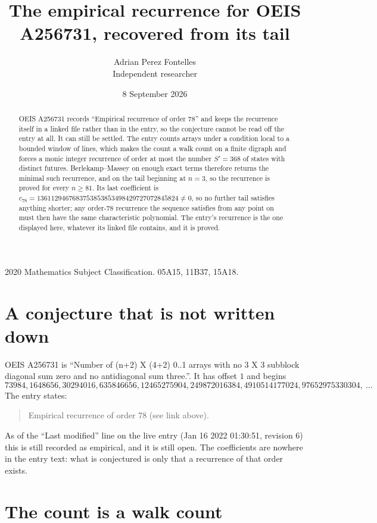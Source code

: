 \documentclass[11pt,a4paper]{article}
\title{The empirical recurrence for OEIS A256731, recovered from its tail}
\author{Adrian Perez Fontelles\\ \small Independent researcher}
\date{8 September 2026}
\theoremstyle{plain}
\theoremstyle{definition}
\begin{document}
\maketitle

\begin{abstract}
OEIS A256731 records ``Empirical recurrence of order $78$'' and keeps the recurrence itself in
a linked file rather than in the entry, so the conjecture cannot be read off the entry at all.
It can still be settled. The entry counts arrays under a condition local to a bounded window of
lines, which makes the count a walk count on a finite digraph and forces a monic integer
recurrence of order at most the number $S'=368$ of states with distinct futures. Berlekamp--Massey on
enough exact terms therefore returns the minimal such recurrence, and on the tail beginning at $n=3$, so the recurrence is proved for every $n\ge81$.
Its last coefficient is $c_{78}=1361129467683753853853498429727072845824\neq0$, so no further tail satisfies anything
shorter; any order-$78$ recurrence the sequence satisfies from any point on must then have
the same characteristic polynomial. The entry's recurrence is the one displayed here, whatever
its linked file contains, and it is proved.
\end{abstract}

\noindent\small 2020 Mathematics Subject Classification. 05A15, 11B37, 15A18.\normalsize

\section{A conjecture that is not written down}

OEIS A256731 is ``Number of (n+2) X (4+2) 0..1 arrays with no 3 X 3 subblock diagonal sum zero and no antidiagonal sum three.''. It has offset $1$ and begins
\[
73984, 1648656, 30294016, 635846656, 12465275904, 249872016384, 4910514177024, 97652975330304,\ \dots
\]
The entry states:
\begin{quote}
Empirical recurrence of order 78 (see link above).
\end{quote}
As of the ``Last modified'' line on the live entry (Jan 16 2022 01:30:51, revision 6)
this is still recorded as empirical, and it is still open. The coefficients are nowhere in the
entry text: what is conjectured is only that a recurrence of that order exists.

\section{The count is a walk count}
\end{document}
